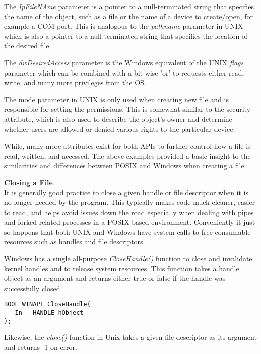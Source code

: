 \documentclass[11pt]{report}
\begin{document}
The \textit{IpFileNAme} parameter is a pointer to a null-terminated string that specifies the name of the object, such as a file or the name of a device to create/open, for example a COM port. This is analogous to the \textit{pathname} parameter in UNIX which is also a pointer to a null-terminated string that specifies the location of the desired file.
 
The \textit{dwDesiredAccess} parameter is the Windows equivalent of the UNIX \textit{flags} parameter which can be combined with a bit-wise 'or' to requests either read, write, and many more privileges from the OS.
 
The mode parameter in UNIX is only used when creating new file and is responsible for setting the permissions. This is somewhat similar to the security attribute, which is also used to describe the object’s owner and determine whether users are allowed or denied various rights to the particular device.
 
While, many more attributes exist for both APIs to further control how a file is read, written, and accessed. The above examples provided a basic insight to the similarities and differences between POSIX and Windows when creating a file.
 

\textbf{\large Closing a File}\\
It is generally good practice to close a given handle or file descriptor when it is no longer needed by the program. This typically makes code much cleaner, easier to read, and helps avoid issues down the road especially when dealing with pipes and forked related processes in a POSIX based environment. Conveniently it just so happens that both UNIX and Windows have system calls to free consumable resources such as handles and file descriptors.
 
Windows has a single all-purpose \textit{CloseHandle()} function to close and invalidate kernel handles and to release system resources. This function takes a handle object as an argument and returns either true or false if the handle was successfully closed.
 
\begin{verbatim}
BOOL WINAPI CloseHandle(
  _In_  HANDLE hObject
);
\end{verbatim}
 
Likewise, the \textit{close()} function in Unix takes a given file descriptor as its argument and returns -1 on error.
 
\end{document}
